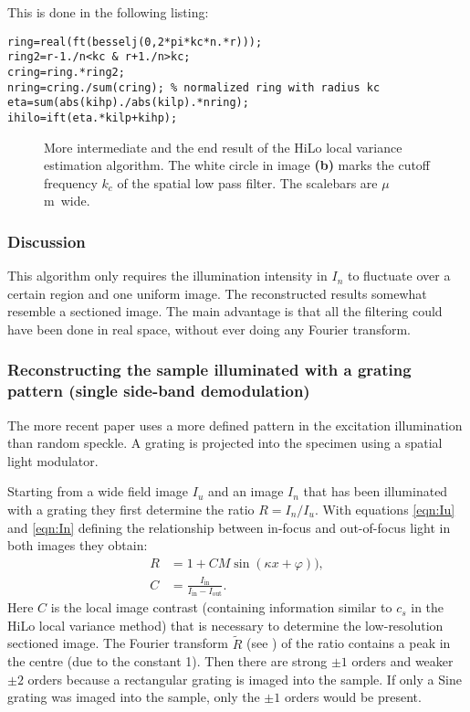 This is done in the following listing:
\begin{lstlisting}
ring=real(ft(besselj(0,2*pi*kc*n.*r)));
ring2=r-1./n<kc & r+1./n>kc;
cring=ring.*ring2;
nring=cring./sum(cring); % normalized ring with radius kc
eta=sum(abs(kihp)./abs(kilp).*nring);
ihilo=ift(eta.*kilp+kihp);
\end{lstlisting}

\begin{figure}[htb]
  \centering
  \caption{More intermediate and the end result of the HiLo local
    variance estimation algorithm. The white circle in image {\bf (b)}
    marks the cutoff frequency $k_c$ of the spatial low pass
    filter. The scalebars are \unit[2]{$\mu$m} wide.}
  \label{fig:hilo1interm2}
\end{figure}

\subsubsection*{Discussion}
This algorithm only requires the illumination intensity in $I_n$ to
fluctuate over a certain region and one uniform image. The
reconstructed results somewhat resemble a sectioned image. The main
advantage is that all the filtering could have been done in real
space, without ever doing any Fourier transform.
\subsubsection{Reconstructing the sample illuminated with a grating
  pattern (single side-band demodulation)}
The more recent paper \cite{2009Santos} uses a more defined pattern in
the excitation illumination than random speckle. A grating is
projected into the specimen using a spatial light modulator.

Starting from a wide field image $I_u$ and an image $I_n$ that has been
illuminated with a grating they first determine the ratio $R=I_n/I_u$.
With equations \eqref{eqn:Iu} and \eqref{eqn:In} defining the
relationship between in-focus and out-of-focus light in both images
they obtain:
\begin{align}
  R&=1+CM\sin(\kappa x+\varphi)),\\
  C&=\frac{I_\textrm{in}}{I_\textrm{in}-I_\textrm{out}}.
\end{align}
Here $C$ is the local image contrast (containing information similar
to $c_s$ in the HiLo local variance method) that is necessary to
determine the low-resolution sectioned image. The Fourier transform
$\tilde R$ (see ) of the ratio contains a peak in the
centre (due to the constant 1). Then there are strong $\pm 1$ orders
and weaker $\pm 2$ orders because a rectangular grating is imaged into
the sample. If only a Sine grating was imaged into the sample, only the $\pm 1$ orders would be present.

